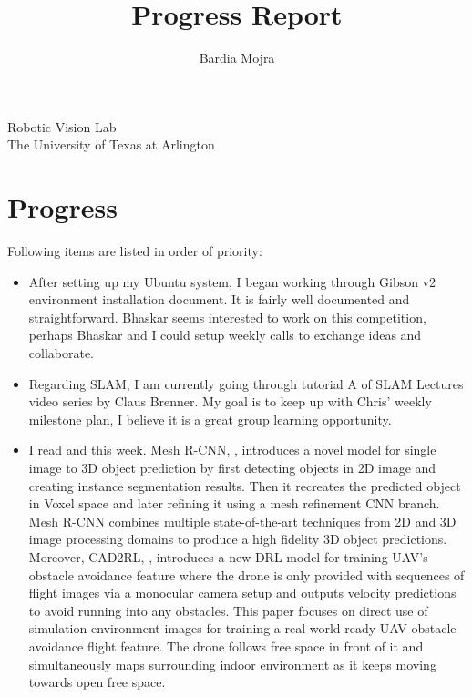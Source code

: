 \documentclass[11pt]{article}
\title{Progress Report}
\author{Bardia Mojra}
\begin{document}
	\maketitle
	\thispagestyle{empty}

\begin{center}
\bigskip
\bigskip
 Robotic Vision Lab \\
 The University of Texas at Arlington\\
\end{center}

\newpage 

\section{Progress}
Following items are listed in order of priority: 
\begin{itemize}  
	
  \item After setting up my Ubuntu system, I began working through Gibson v2 environment installation document. It is fairly well documented and straightforward. Bhaskar seems interested to work on this competition, perhaps Bhaskar and I could setup weekly calls to exchange ideas and collaborate. 
   
  \item Regarding SLAM, I am currently going through tutorial A of SLAM Lectures video series by Claus Brenner. My goal is to keep up with Chris' weekly milestone plan, I believe it is a great group learning opportunity.  
  
  \item I read \cite{MeshRCNN} and \cite{CAD2RL} this week. Mesh R-CNN, \cite{MeshRCNN}, introduces a novel model for single image to 3D object prediction by first detecting objects in 2D image and creating instance segmentation results. Then it recreates the predicted object in Voxel space and later refining it using a mesh refinement CNN branch. Mesh R-CNN combines multiple state-of-the-art techniques from 2D and 3D image processing domains to produce a high fidelity 3D object predictions. Moreover, CAD2RL, \cite{CAD2RL}, introduces a new DRL model for training UAV's obstacle avoidance feature where the drone is only provided with sequences of flight images via a monocular camera setup and outputs velocity predictions to avoid running into any obstacles. This paper focuses on direct use of simulation environment images for training a real-world-ready UAV obstacle avoidance flight feature. The drone follows free space in front of it and simultaneously maps surrounding indoor environment as it keeps moving towards open free space.     
  

\end{itemize}
\end{document}
